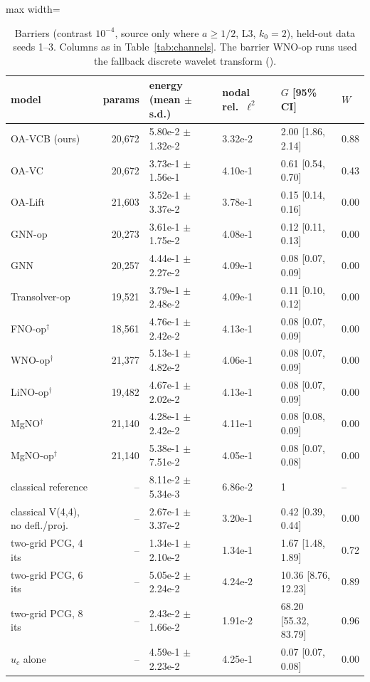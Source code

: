 \begin{table}[tbp]\centering\footnotesize\setlength{\tabcolsep}{4pt}
\caption{Barriers (contrast $10^{-4}$, source only where $a\ge1/2$, L3, $k_0=2$), held-out data seeds 1--3. Columns as in Table~\ref{tab:channels}. The barrier WNO-op runs used the fallback discrete wavelet transform ().}\label{tab:barriers}
\begin{adjustbox}{max width=\linewidth}
\begin{tabular}{lrllll}\toprule
model & params & energy (mean $\pm$ s.d.) & nodal rel.\ $\ell^2$ & $G$ [95\% CI] & $W$ \\\midrule
OA-VCB (ours) & 20{,}672 & 5.80e-2 $\pm$ 1.32e-2 & 3.32e-2 & 2.00 [1.86, 2.14] & 0.88 \\
OA-VC & 20{,}672 & 3.73e-1 $\pm$ 1.56e-1 & 4.10e-1 & 0.61 [0.54, 0.70] & 0.43 \\
OA-Lift & 21{,}603 & 3.52e-1 $\pm$ 3.37e-2 & 3.78e-1 & 0.15 [0.14, 0.16] & 0.00 \\
GNN-op & 20{,}273 & 3.61e-1 $\pm$ 1.75e-2 & 4.08e-1 & 0.12 [0.11, 0.13] & 0.00 \\
GNN & 20{,}257 & 4.44e-1 $\pm$ 2.27e-2 & 4.09e-1 & 0.08 [0.07, 0.09] & 0.00 \\
Transolver-op & 19{,}521 & 3.79e-1 $\pm$ 2.48e-2 & 4.09e-1 & 0.11 [0.10, 0.12] & 0.00 \\
FNO-op$^\dagger$ & 18{,}561 & 4.76e-1 $\pm$ 2.42e-2 & 4.13e-1 & 0.08 [0.07, 0.09] & 0.00 \\
WNO-op$^\dagger$ & 21{,}377 & 5.13e-1 $\pm$ 4.82e-2 & 4.06e-1 & 0.08 [0.07, 0.09] & 0.00 \\
LiNO-op$^\dagger$ & 19{,}482 & 4.67e-1 $\pm$ 2.02e-2 & 4.13e-1 & 0.08 [0.07, 0.09] & 0.00 \\
MgNO$^\dagger$ & 21{,}140 & 4.28e-1 $\pm$ 2.42e-2 & 4.11e-1 & 0.08 [0.08, 0.09] & 0.00 \\
MgNO-op$^\dagger$ & 21{,}140 & 5.38e-1 $\pm$ 7.51e-2 & 4.05e-1 & 0.08 [0.07, 0.08] & 0.00 \\
\midrule
classical reference & -- & 8.11e-2 $\pm$ 5.34e-3 & 6.86e-2 & 1 & -- \\
classical V(4,4), no defl./proj. & -- & 2.67e-1 $\pm$ 3.37e-2 & 3.20e-1 & 0.42 [0.39, 0.44] & 0.00 \\
two-grid PCG, 4 its & -- & 1.34e-1 $\pm$ 2.10e-2 & 1.34e-1 & 1.67 [1.48, 1.89] & 0.72 \\
two-grid PCG, 6 its & -- & 5.05e-2 $\pm$ 2.24e-2 & 4.24e-2 & 10.36 [8.76, 12.23] & 0.89 \\
two-grid PCG, 8 its & -- & 2.43e-2 $\pm$ 1.66e-2 & 1.91e-2 & 68.20 [55.32, 83.79] & 0.96 \\
$u_c$ alone & -- & 4.59e-1 $\pm$ 2.23e-2 & 4.25e-1 & 0.07 [0.07, 0.08] & 0.00 \\
\bottomrule\end{tabular}
\end{adjustbox}
\end{table}
